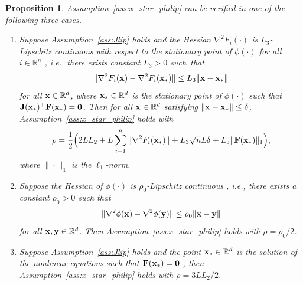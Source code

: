 \documentclass[11pt]{article}
\theoremstyle{plain}
\newtheorem{proposition}[theorem]{Proposition}
\theoremstyle{definition}
\theoremstyle{remark}
\newtheorem{remark}[theorem]{Remark}
\theoremstyle{plain}
\def\vzero{{\bf{0}}}
\def\vx{{\bf{x}}}
\def\vy{{\bf{y}}}
\def\BR{{\mathbb{R}}}
\def\mF {{\bf F}}
\def\mJ {{\bf J}}
\def\vx {{{\bf x}}}
\def\vy {{{\bf y}}}
\def\BR{{\mathbb{R}}}
\def\F{{\bf F}}
\def\x{{\bf x}}
\def\y{{\bf y}}
\def\0{{\bf 0}}
\begin{document}
\begin{proposition}
\label{prop:assumption-sati}
    Assumption~\ref{ass:x_star_philip} can be verified in one of the following three cases.
    \begin{enumerate}
        \item  Suppose Assumption~\ref{ass:Jlip} holds and the Hessian $\nabla^2 F_i(\cdot)$ is $L_3$-Lipschitz continuous with respect to the stationary point of $\phi(\cdot)$ for all $i\in\BR^n$
         \citep[Assumption AS.1]{gould2019convergence} \citep[Lemma 2.9--2.11]{zhou2010global}, i.e., there exists constant $L_3>0$ such~that
        \begin{align*}
        \|\nabla^2F_i(\x)-\nabla^2 F_i(\x_*)\|
        \leq L_3\|\x-\x_*\|    
        \end{align*}
        for all $\vx\in\BR^d$, where $\vx_*\in\BR^d$ is the stationary point of $\phi(\cdot)$ such that $\mJ(\vx_*)^\top\mF(\vx_*)=\vzero$.
        Then for all $\x\in\BR^d$ satisfying $\|\x-\x_*\|\leq\delta$, Assumption~\ref{ass:x_star_philip} holds with
        \begin{align}\label{eq:rho-cond-1}
        \rho
        =\frac{1}{2}\Big(2LL_2+L\sum_{i=1}^{n}\|\nabla^2 F_i(\x_*)\|
        +L_3\sqrt{n}L\delta+L_3\|\F(\x_*)\|_1\Big),
        \end{align}
        where $\|\cdot\|_1$ is the $\ell_1$-norm.
        \item  Suppose the Hessian of $\phi(\cdot)$ is $\rho_0$-Lipschitz continuous \citep[Assumption B]{zhou2010global} , i.e., there exists a constant $\rho_0>0$ such that
        \begin{align}\label{eq:phi-2-Lip-xy}
        \|\nabla^2\phi(\x)-\nabla^2\phi(\y)\|
        \leq\rho_0\|\x-\y\|
        \end{align}
        for all $\vx,\vy\in\BR^d$.
        Then Assumption~\ref{ass:x_star_philip} holds with $\rho=\rho_0/2$.
        \item Suppose Assumption~\ref{ass:Jlip} holds and the point $\x_*\in\BR^d$ is the solution of the nonlinear equations such that $\F(\x_*)= \0$ \citep{vater2024convergence, liu2023block}, then Assumption~\ref{ass:x_star_philip} holds with $\rho = {3LL_2}/{2}$.
    \end{enumerate}
\end{proposition}
\end{document}
